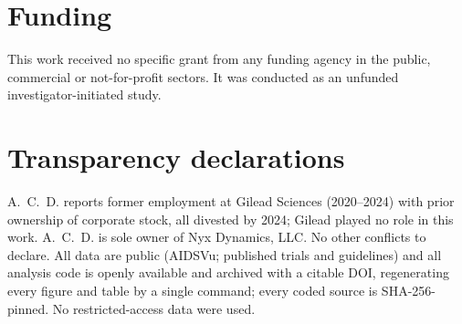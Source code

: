 \documentclass[12pt,a4paper]{article}
\begin{document}
\section*{Funding}
This work received no specific grant from any funding agency in the public,
commercial or not-for-profit sectors. It was conducted as an unfunded
investigator-initiated study.

\section*{Transparency declarations}
A.~C.~D. reports former employment at Gilead Sciences (2020--2024) with prior
ownership of corporate stock, all divested by 2024; Gilead played no role in this
work. A.~C.~D. is sole owner of Nyx Dynamics, LLC. No other conflicts to declare.
All data are public (AIDSVu; published trials and guidelines) and all analysis
code is openly available and archived with a citable DOI, regenerating every
figure and table by a single command; every coded source is SHA-256-pinned. No
restricted-access data were used.


\end{document}
